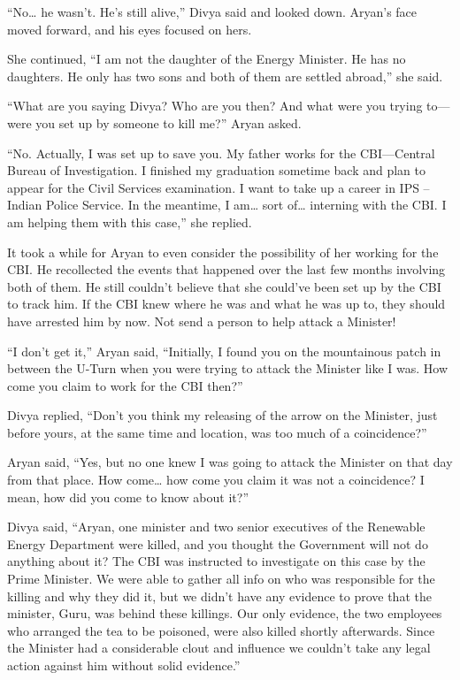 “No… he wasn't. He's still alive,” Divya said and looked down. Aryan's face
moved forward, and his eyes focused on hers.

She continued, “I am not the daughter of the Energy Minister. He has no
daughters. He only has two sons and both of them are settled abroad,” she said.

“What are you saying Divya? Who are you then? And what were you trying to—were
you set up by someone to kill me?” Aryan asked.

“No. Actually, I was set up to save you. My father works for the CBI—Central
Bureau of Investigation. I finished my graduation sometime back and plan to
appear for the Civil Services examination. I want to take up a career in IPS –
Indian Police Service. In the meantime, I am… sort of… interning with
the CBI. I am helping them with this case,” she replied.

It took a while for Aryan to even consider the possibility of her working for
the CBI. He recollected the events that happened over the last few months
involving both of them. He still couldn't believe that she could've been set up
by the CBI to track him. If the CBI knew where he was and what he was up to,
they should have arrested him by now. Not send a person to help attack a
Minister!

“I don't get it,” Aryan said, “Initially, I found you on the mountainous patch
in between the U-Turn when you were trying to attack the Minister like I was.
How come you claim to work for the CBI then?”

Divya replied, “Don't you think my releasing of the arrow on the Minister, just
before yours, at the same time and location, was too much of a coincidence?”

Aryan said, “Yes, but no one knew I was going to attack the Minister on that day
from that place. How come… how come you claim it was not a coincidence? I
mean, how did you come to know about it?”

Divya said, “Aryan, one minister and two senior executives of the Renewable
Energy Department were killed, and you thought the Government will not do
anything about it? The CBI was instructed to investigate on this case by the
Prime Minister. We were able to gather all info on who was responsible for the
killing and why they did it, but we didn't have any evidence to prove that the
minister, Guru, was behind these killings. Our only evidence, the two employees
who arranged the tea to be poisoned, were also killed shortly afterwards. Since
the Minister had a considerable clout and influence we couldn't take any legal
action against him without solid evidence.”

